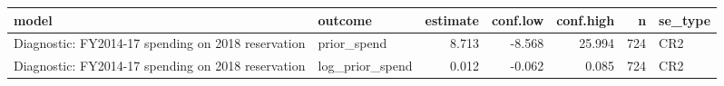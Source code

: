 
\begin{tabular}{llrrrrl}
\toprule
model & outcome & estimate & conf.low & conf.high & n & se\_type\\
\midrule
Diagnostic: FY2014-17 spending on 2018 reservation & prior\_spend & 8.713 & -8.568 & 25.994 & 724 & CR2\\
Diagnostic: FY2014-17 spending on 2018 reservation & log\_prior\_spend & 0.012 & -0.062 & 0.085 & 724 & CR2\\
\bottomrule
\end{tabular}

